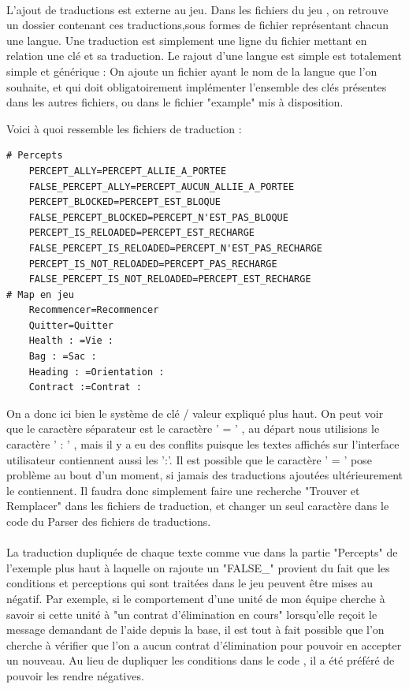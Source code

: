 \documentclass{report}
\begin{document}
\paragraph{}
L'ajout de traductions est externe au jeu. 
Dans les fichiers du jeu , on retrouve un dossier contenant ces traductions,sous formes de fichier représentant chacun une langue.
Une traduction est simplement une ligne du fichier mettant en relation une clé et sa traduction.
Le rajout d'une langue est simple est totalement simple et générique :
On ajoute un fichier ayant le nom de la langue que l'on souhaite, et qui doit obligatoirement implémenter l'ensemble des clés présentes dans les autres fichiers, ou dans le fichier "example" mis à disposition.

Voici à quoi ressemble les fichiers de traduction :
\begin{lstlisting}[language=XML]
# Percepts
	PERCEPT_ALLY=PERCEPT_ALLIE_A_PORTEE
	FALSE_PERCEPT_ALLY=PERCEPT_AUCUN_ALLIE_A_PORTEE
	PERCEPT_BLOCKED=PERCEPT_EST_BLOQUE
	FALSE_PERCEPT_BLOCKED=PERCEPT_N'EST_PAS_BLOQUE
	PERCEPT_IS_RELOADED=PERCEPT_EST_RECHARGE
	FALSE_PERCEPT_IS_RELOADED=PERCEPT_N'EST_PAS_RECHARGE
	PERCEPT_IS_NOT_RELOADED=PERCEPT_PAS_RECHARGE
	FALSE_PERCEPT_IS_NOT_RELOADED=PERCEPT_EST_RECHARGE
# Map en jeu 
	Recommencer=Recommencer
	Quitter=Quitter
	Health : =Vie : 
	Bag : =Sac : 
	Heading : =Orientation : 
	Contract :=Contrat :
\end{lstlisting}

On a donc ici bien le système de clé / valeur expliqué plus haut. 
On peut voir que le caractère séparateur est le caractère ' = ' , au départ nous utilisions le caractère ' : ' , mais il y a eu des conflits puisque les textes affichés sur l'interface utilisateur contiennent aussi les ':'.
Il est possible que le caractère ' = ' pose problème au bout d'un moment, si jamais des traductions ajoutées ultérieurement le contiennent. Il faudra donc simplement faire une recherche "Trouver et Remplacer" dans les fichiers de traduction, et changer un seul caractère dans le code du Parser des fichiers de traductions. 

\paragraph{}

La traduction dupliquée de chaque texte comme vue dans la partie "Percepts" de l'exemple plus haut à laquelle on rajoute un "FALSE_" provient du fait que les conditions et perceptions qui sont traitées dans le jeu peuvent être mises au négatif. Par exemple, si le comportement d'une unité de mon équipe cherche à savoir si cette unité à "un contrat d'élimination en cours" lorsqu'elle reçoit le message demandant de l'aide depuis la base, il est tout à fait possible que l'on cherche à vérifier que l'on a aucun contrat d'élimination pour pouvoir en accepter un nouveau.
Au lieu de dupliquer les conditions dans le code , il a été préféré de pouvoir les rendre négatives.
\end{document}
